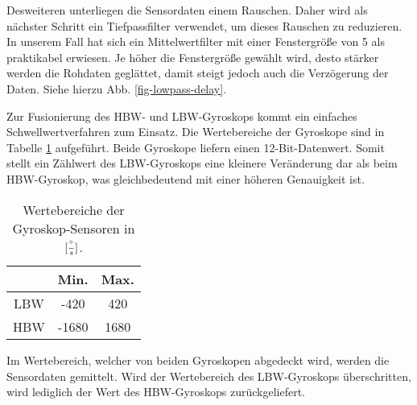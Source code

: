 
Desweiteren unterliegen die Sensordaten einem Rauschen. Daher wird als
nächster Schritt ein Tiefpassfilter verwendet, um dieses Rauschen zu
reduzieren. In unserem Fall hat sich ein Mittelwertfilter mit einer 
Fenstergröße von 5 als praktikabel erwiesen. Je höher die Fenstergröße gewählt wird,
desto stärker werden die Rohdaten geglättet, damit steigt jedoch auch
die Verzögerung der Daten.  Siehe hierzu Abb. \ref{fig-lowpass-delay}.


Zur Fusionierung des HBW- und LBW-Gyroskops kommt ein einfaches
Schwellwertverfahren zum Einsatz. Die Wertebereiche der Gyroskope sind
in Tabelle \ref{tab:ranges-gyros} aufgeführt. Beide Gyroskope liefern
einen 12-Bit-Datenwert. Somit stellt ein Zählwert des LBW-Gyroskops eine
kleinere Veränderung dar als beim HBW-Gyroskop, was gleichbedeutend mit
einer höheren Genauigkeit ist.

\begin{table}[position specifier]
  \centering
  \begin{tabular}{ | c | c | c | }
    \hline
    & Min. & Max. \\ \hline
    LBW & -420   & 420   \\ \hline
    HBW & -1680   & 1680   \\
    \hline
  \end{tabular}
  \caption{Wertebereiche der Gyroskop-Sensoren in $[{\degree \over s}]$.}
  \label{tab:ranges-gyros}
\end{table}


Im Wertebereich, welcher von beiden Gyroskopen abgedeckt wird, werden
die Sensordaten gemittelt. Wird der Wertebereich des LBW-Gyroskops
überschritten, wird lediglich der Wert des HBW-Gyroskops
zurückgeliefert. 


